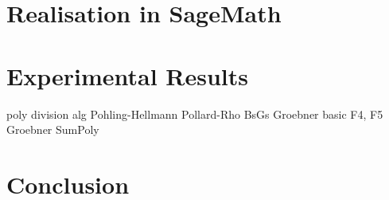 \documentclass[thesis=M,english]{FITthesis}[2012/10/20]
\theoremstyle{remark}
\theoremstyle{definition}
\newtheorem{DF}{Definition}[section]
\begin{document}





\chapter{Realisation in SageMath}

\chapter{Experimental Results}
\label{expResults}
poly division alg
Pohling-Hellmann
Pollard-Rho
BsGs
Groebner basic
F4, F5 Groebner
SumPoly 

\chapter{Conclusion}


%
%


\appendix
\end{document}
